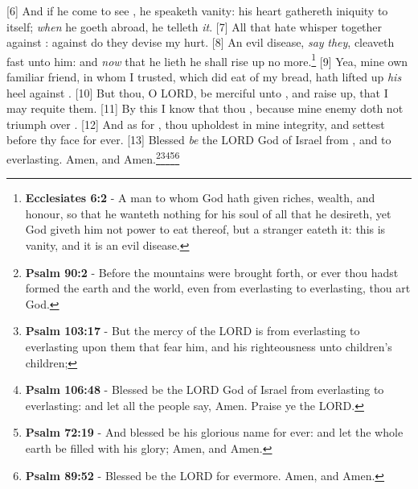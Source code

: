 [6] \textcolor[cmyk]{0.99998,1,0,0}{And if he come to see \emph{}, he speaketh vanity: his heart gathereth iniquity to itself; \emph{when} he goeth abroad, he telleth \emph{it}.}
[7] \textcolor[cmyk]{0.99998,1,0,0}{All that hate  whisper together against : against  do they devise my hurt.}
[8] \textcolor[cmyk]{0.99998,1,0,0}{An evil disease, \emph{say} \emph{they}, cleaveth fast unto him: and \emph{now} that he lieth he shall rise up no more.}\footnote{\textbf{Ecclesiates 6:2} - A man to whom God hath given riches, wealth, and honour, so that he wanteth nothing for his soul of all that he desireth, yet God giveth him not power to eat thereof, but a stranger eateth it: this is vanity, and it is an evil disease.}
[9] \textcolor[cmyk]{0.99998,1,0,0}{Yea, mine own familiar friend, in whom I trusted, which did eat of my bread, hath lifted up \emph{his} heel against .}
[10] \textcolor[cmyk]{0.99998,1,0,0}{But thou, O LORD, be merciful unto , and raise  up, that I may requite them.}
[11] \textcolor[cmyk]{0.99998,1,0,0}{By this I know that thou  , because mine enemy doth not triumph over .}
[12] \textcolor[cmyk]{0.99998,1,0,0}{And as for , thou upholdest  in mine integrity, and settest  before thy face for ever.}
[13] \textcolor[cmyk]{0.99998,1,0,0}{Blessed \emph{be} the LORD God of Israel from , and to everlasting. Amen, and Amen.}\footnote{\textbf{Psalm 90:2} - Before the mountains were brought forth, or ever thou hadst formed the earth and the world, even from everlasting to everlasting, thou art God.}\footnote{\textbf{Psalm 103:17} - But the mercy of the LORD is from everlasting to everlasting upon them that fear him, and his righteousness unto children’s children;}\footnote{\textbf{Psalm 106:48} - Blessed be the LORD God of Israel from everlasting to everlasting: and let all the people say, Amen. Praise ye the LORD.}\footnote{\textbf{Psalm 72:19} - And blessed be his glorious name for ever: and let the whole earth be filled with his glory; Amen, and Amen.}\footnote{\textbf{Psalm 89:52} - Blessed be the LORD for evermore. Amen, and Amen.}



